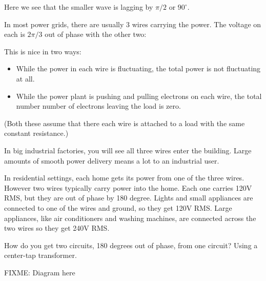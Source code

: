 Here we see that the smaller wave is lagging by $\pi/2$ or $90^\circ$.

In most power grids, there are usually 3 wires carrying the power.
The voltage on each is $2\pi/3$ out of phase with the other two:


This is nice in two ways:
\begin{itemize}
\item While the power in each wire is fluctuating, the total power is not fluctuating at all.
\item While the power plant is pushing and pulling electrons on each
  wire, the total number number of electrons leaving the load is zero.
\end{itemize}
(Both these assume that there each wire is attached to a load with the same constant resistance.)

In big industrial factories, you will see all three wires enter the
building. Large amounts of smooth power delivery means a lot to an
industrial user.

In residential settings, each home gets its power from one of the three
wires. However two wires typically carry power into the home. Each
one carries 120V RMS, but they are out of phase by 180 degree. Lights
and small appliances are connected to one of the wires and ground, so
they get 120V RMS.  Large appliances, like air conditioners and
washing machines, are connected across the two wires so they get 240V
RMS.



How do you get two circuits, 180 degrees out of phase, from one
circuit?  Using a center-tap transformer.

FIXME: Diagram here




